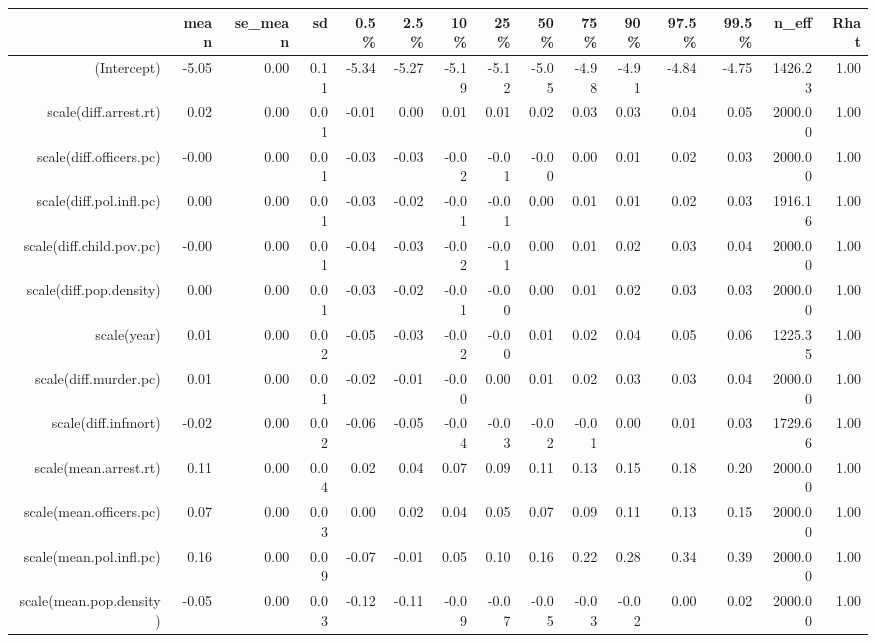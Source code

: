 \begin{table}[ht]
\centering
\begin{tabular}{rrrrrrrrrrrrrrr}
  \hline
 & mean & se\_mean & sd & 0.5\% & 2.5\% & 10\% & 25\% & 50\% & 75\% & 90\% & 97.5\% & 99.5\% & n\_eff & Rhat \\ 
  \hline
(Intercept) & -5.05 & 0.00 & 0.11 & -5.34 & -5.27 & -5.19 & -5.12 & -5.05 & -4.98 & -4.91 & -4.84 & -4.75 & 1426.23 & 1.00 \\ 
  scale(diff.arrest.rt) & 0.02 & 0.00 & 0.01 & -0.01 & 0.00 & 0.01 & 0.01 & 0.02 & 0.03 & 0.03 & 0.04 & 0.05 & 2000.00 & 1.00 \\ 
  scale(diff.officers.pc) & -0.00 & 0.00 & 0.01 & -0.03 & -0.03 & -0.02 & -0.01 & -0.00 & 0.00 & 0.01 & 0.02 & 0.03 & 2000.00 & 1.00 \\ 
  scale(diff.pol.infl.pc) & 0.00 & 0.00 & 0.01 & -0.03 & -0.02 & -0.01 & -0.01 & 0.00 & 0.01 & 0.01 & 0.02 & 0.03 & 1916.16 & 1.00 \\ 
  scale(diff.child.pov.pc) & -0.00 & 0.00 & 0.01 & -0.04 & -0.03 & -0.02 & -0.01 & 0.00 & 0.01 & 0.02 & 0.03 & 0.04 & 2000.00 & 1.00 \\ 
  scale(diff.pop.density) & 0.00 & 0.00 & 0.01 & -0.03 & -0.02 & -0.01 & -0.00 & 0.00 & 0.01 & 0.02 & 0.03 & 0.03 & 2000.00 & 1.00 \\ 
  scale(year) & 0.01 & 0.00 & 0.02 & -0.05 & -0.03 & -0.02 & -0.00 & 0.01 & 0.02 & 0.04 & 0.05 & 0.06 & 1225.35 & 1.00 \\ 
  scale(diff.murder.pc) & 0.01 & 0.00 & 0.01 & -0.02 & -0.01 & -0.00 & 0.00 & 0.01 & 0.02 & 0.03 & 0.03 & 0.04 & 2000.00 & 1.00 \\ 
  scale(diff.infmort) & -0.02 & 0.00 & 0.02 & -0.06 & -0.05 & -0.04 & -0.03 & -0.02 & -0.01 & 0.00 & 0.01 & 0.03 & 1729.66 & 1.00 \\ 
  scale(mean.arrest.rt) & 0.11 & 0.00 & 0.04 & 0.02 & 0.04 & 0.07 & 0.09 & 0.11 & 0.13 & 0.15 & 0.18 & 0.20 & 2000.00 & 1.00 \\ 
  scale(mean.officers.pc) & 0.07 & 0.00 & 0.03 & 0.00 & 0.02 & 0.04 & 0.05 & 0.07 & 0.09 & 0.11 & 0.13 & 0.15 & 2000.00 & 1.00 \\ 
  scale(mean.pol.infl.pc) & 0.16 & 0.00 & 0.09 & -0.07 & -0.01 & 0.05 & 0.10 & 0.16 & 0.22 & 0.28 & 0.34 & 0.39 & 2000.00 & 1.00 \\ 
  scale(mean.pop.density) & -0.05 & 0.00 & 0.03 & -0.12 & -0.11 & -0.09 & -0.07 & -0.05 & -0.03 & -0.02 & 0.00 & 0.02 & 2000.00 & 1.00 \\ 

\end{tabular}
\end{table}
